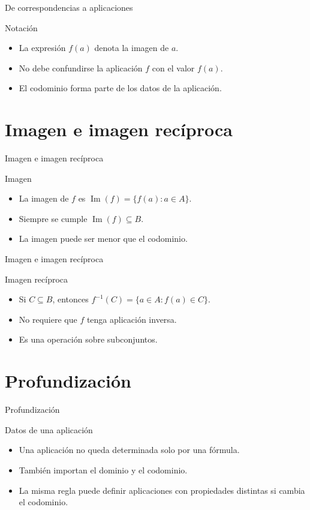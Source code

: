\documentclass[aspectratio=169,11pt]{beamer}
\begin{document}
\begin{frame}{De correspondencias a aplicaciones}
\begin{block}{Notación}
\begin{itemize}
  \item La expresión \(f(a)\) denota la imagen de \(a\).
  \item No debe confundirse la aplicación \(f\) con el valor \(f(a)\).
  \item El codominio forma parte de los datos de la aplicación.
\end{itemize}
\end{block}
\end{frame}

\section{Imagen e imagen recíproca}

\begin{frame}{Imagen e imagen recíproca}
\begin{block}{Imagen}
\begin{itemize}
  \item La imagen de \(f\) es \(\operatorname{Im}(f)=\{f(a):a\in A\}\).
  \item Siempre se cumple \(\operatorname{Im}(f)\subseteq B\).
  \item La imagen puede ser menor que el codominio.
\end{itemize}
\end{block}
\end{frame}

\begin{frame}{Imagen e imagen recíproca}
\begin{block}{Imagen recíproca}
\begin{itemize}
  \item Si \(C\subseteq B\), entonces \(f^{-1}(C)=\{a\in A:f(a)\in C\}\).
  \item No requiere que \(f\) tenga aplicación inversa.
  \item Es una operación sobre subconjuntos.
\end{itemize}
\end{block}
\end{frame}

\section{Profundización}

\begin{frame}{Profundización}
\begin{block}{Datos de una aplicación}
\begin{itemize}
  \item Una aplicación no queda determinada solo por una fórmula.
  \item También importan el dominio y el codominio.
  \item La misma regla puede definir aplicaciones con propiedades distintas si cambia el codominio.
\end{itemize}
\end{block}
\end{frame}
\end{document}
